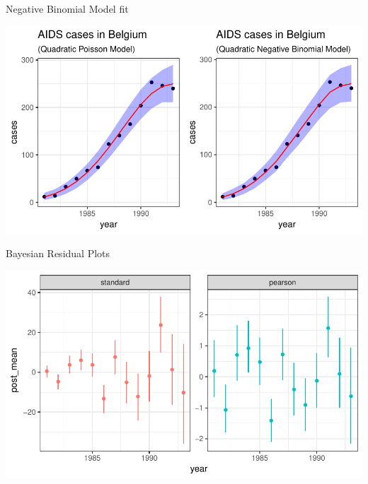 \documentclass[11pt,ignorenonframetext,]{beamer}
\begin{document}
\begin{frame}{Negative Binomial Model fit}

\includegraphics{Lec3_files/figure-beamer/unnamed-chunk-30-1.pdf}

\end{frame}

\begin{frame}{Bayesian Residual Plots}

\includegraphics[width=\textwidth]{Lec3_files/figure-beamer/unnamed-chunk-31-1}

\end{frame}
\end{document}
